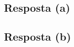 \documentclass[final,3p]{elsarticle}
\numberwithin{equation}{section}
\begin{document}
    \subsection{Resposta \textbf{(a)}}


    \subsection{Resposta \textbf{(b)}}




% 
% 





\end{document}
